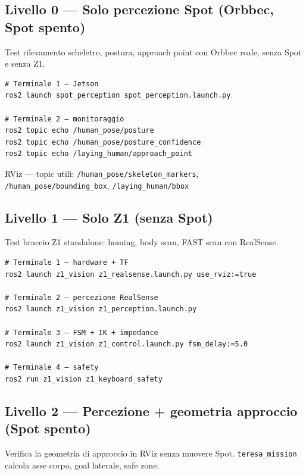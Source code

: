 \documentclass[a4paper,11pt]{article}
\begin{document}
\subsection*{Livello 0 — Solo percezione Spot (Orbbec, Spot spento)}
Test rilevamento scheletro, postura, approach point con Orbbec reale,
senza Spot e senza Z1.

\begin{lstlisting}
# Terminale 1 — Jetson
ros2 launch spot_perception spot_perception.launch.py

# Terminale 2 — monitoraggio
ros2 topic echo /human_pose/posture
ros2 topic echo /human_pose/posture_confidence
ros2 topic echo /laying_human/approach_point
\end{lstlisting}

RViz — topic utili: \texttt{/human\_pose/skeleton\_markers},
\texttt{/human\_pose/bounding\_box}, \texttt{/laying\_human/bbox}

\subsection*{Livello 1 — Solo Z1 (senza Spot)}
Test braccio Z1 standalone: homing, body scan, FAST scan con RealSense.

\begin{lstlisting}
# Terminale 1 — hardware + TF
ros2 launch z1_vision z1_realsense.launch.py use_rviz:=true

# Terminale 2 — percezione RealSense
ros2 launch z1_vision z1_perception.launch.py

# Terminale 3 — FSM + IK + impedance
ros2 launch z1_vision z1_control.launch.py fsm_delay:=5.0

# Terminale 4 — safety
ros2 run z1_vision z1_keyboard_safety
\end{lstlisting}

\subsection*{Livello 2 — Percezione + geometria approccio (Spot spento)}
Verifica la geometria di approccio in RViz senza muovere Spot.
\texttt{teresa\_mission} calcola asse corpo, goal laterale, safe zone.
\end{document}
